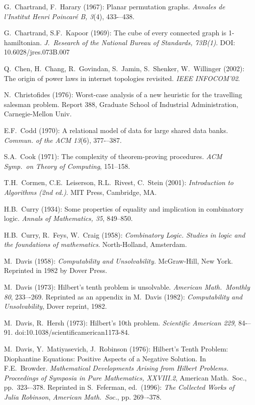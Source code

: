 \begin{thebibliography}{999}
G.~Chartrand, F.~Harary (1967):
Planar permutation graphs.
{\it Annales de l'Institut Henri Poincar\'{e} B, 3}(4), 433-–438.

G.~Chartrand, S.F.~Kapoor (1969):
The cube of every connected graph is 1-hamiltonian.
{\it J.~Research of the National Bureau of Standards, 73B(1)}.  DOI:
10.6028/jres.073B.007

Q.~Chen, H.~Chang, R.~Govindan, S.~Jamin, S.~Shenker,
W.~Willinger (2002):
The origin of power laws in internet topologies revisited.
{\it IEEE INFOCOM'02}.

N.~Christofides (1976):
Worst-case analysis of a new heuristic for the travelling salesman
problem.  Report 388, Graduate School of Industrial Administration,
Carnegie-Mellon Univ.

E.F.~Codd (1970):
A relational model of data for large shared data banks.
{\it Commun. of the ACM 13}(6), 377-–387.

S.A.~Cook (1971): The complexity of theorem-proving procedures.  {\it
  ACM Symp.~on Theory of Computing}, 151--158.

T.H.~Cormen, C.E.~Leiserson, R.L.~Rivest, C.~Stein (2001):
{\it Introduction to Algorithms (2nd ed.)}.
MIT Press, Cambridge, MA.

H.B.~Curry (1934): Some properties of equality and implication in
combinatory logic.  {\it Annals of Mathematics, 35}, 849--850.

H.B.~Curry, R.~Feys, W.~Craig (1958):
{\it Combinatory Logic.  Studies in logic and the foundations of
mathematics}.  North-Holland, Amsterdam.


M.~Davis (1958):
{\it Computability and Unsolvability.}
McGraw-Hill, New York.  Reprinted in 1982 by Dover Press.

M.~Davis (1973):
Hilbert's tenth problem is unsolvable.
{\it American Math.~Monthly 80}, 233–-269.  Reprinted as an appendix
in M.~Davis (1982): {\it Computability and Unsolvability}, Dover
reprint, 1982.

M.~Davis, R.~Hersh (1973): 
Hilbert's 10th problem.  {\it Scientific American 229},
84-–91.  doi:10.1038/scientificamerican1173-84.

M.~Davis, Y.~Matiyasevich, J.~Robinson (1976): Hilbert's Tenth
Problem: Diophantine Equations: Positive Aspects of a Negative
Solution.  In F.E.~Browder.  {\it Mathematical Developments Arising
  from Hilbert Problems.}  {\it Proceedings of Symposia in Pure
  Mathematics, XXVIII.2}, American Math.~Soc., pp.~323-–378.
Reprinted in S.~Feferman, ed.~(1996): {\it The Collected Works of
  Julia Robinson}, {\it American Math.~Soc.}, pp. 269–-378.


\end{thebibliography}
